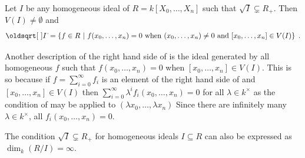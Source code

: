 \documentclass[a4paper,parskip=half,numbers=enddot, DIV=12]{scrreprt}
\begin{document}
\begin{prop}
    Let $I$ be any homogeneous ideal of $R=k[X_0,\ldots, X_n]$ such that $\sqrt{I}\subsetneq R_+$. Then $V(I)\neq\emptyset$ and 
    \begin{align}\lbl{eq:projectiveRadical}
        \sqrt{I}= \left\{f\in R\st f(x_0,\ldots, x_n) = 0 \text{ when }(x_0,\ldots,x_n)\neq 0\text{ and } [x_0,\ldots, x_n]\in V(I)\right\}\;.
    \end{align}
\end{prop}
\begin{rem*}
    \begin{alphanumerate}
        \item 
            Another description of the right hand side of  is the ideal generated by all homogeneous $f$ such that $f(x_0,\ldots,x_n)=0$ when $[x_0,\ldots,x_n]\in V(I)$. This is so because if $f= \sum_{i=0}^\infty f_i$ is an element of the right hand side of  and $[x_0,\ldots, x_n]\in V(I)$ then $\sum_{i=0}^\infty \lambda^i f_i(x_0,\ldots,x_n) = 0$ for all $\lambda\in k^\times$ as the condition of  may be applied to $(\lambda x_0,\ldots, \lambda x_n)$ Since there are infinitely many $\lambda\in k^\times$, all $f_i(x_0,\ldots, x_n) = 0$.
        \item 
            The condition $\sqrt{I}\subsetneq R_+$ for homogeneous ideals $I\subseteq R$ can also be expressed as $\dim_k(R/I) = \infty$.
    \end{alphanumerate}
\end{rem*}
\end{document}
